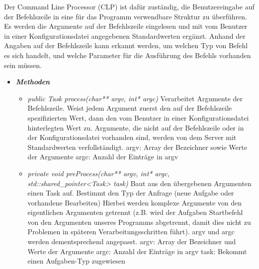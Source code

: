 \documentclass[a4paper,12pt]{article}
\begin{document}
Der Command Line Processor (CLP) ist dafür zuständig, die Benutzereingabe auf der Befehlszeile in eine für das Programm verwendbare Struktur zu überführen. Es werden die Argumente auf der Befehlszeile eingelesen und mit vom Benutzer in einer Konfigurationsdatei angegebenen Standardwerten ergänzt. Anhand der Angaben auf der Befehlszeile kann erkannt werden, um welchen Typ von Befehl es sich handelt, und welche Parameter für die Ausführung des Befehls vorhanden sein müssen.

\begin{itemize}[label={}]

	\item \textit{\textbf{Methoden}}
		\begin{itemize}[label={\textbullet}]
			\item \textit{public Task process(char** argv, int* argc)} Verarbeitet Argumente der Befehlszeile. Weist jedem Argument zuerst den auf der Befehlszeile spezifizierten Wert, dann den vom Benutzer in einer Konfigurationsdatei hinterlegten Wert zu. Argumente, die nicht auf der Befehlszeile oder in der Konfigurationsdatei vorhanden sind, werden von dem Server mit Standardwerten verfollständigt.\newline
			\newline
			argv: Array der Bezeichner sowie Werte der Argumente\newline
			argc: Anzahl der Einträge in argv


			\item \textit{private void preProcess(char** argv, int* argc, std::shared\_pointer<Task> task)}
			Baut aus den übergebenen Argumenten einen Task auf.\newline
			Bestimmt den Typ der Anfrage (neue Aufgabe oder vorhandene Bearbeiten)\newline
			Hierbei werden komplexe Argumente von den eigentlichen Argumenten getrennt (z.B. wird der Aufgaben 	Startbefehl von den Argumenten unseres Programms abgetrennt, damit dies nicht zu Problemen in späteren
			Verarbeitungsschritten führt).\newline
			argv und argc werden dementsprechend angepasst.\newline
			\newline
			argv: Array der Bezeichner und Werte der Argumente\newline
			argc: Anzahl der Einträge in argv\newline
			task: Bekommt einen Aufgaben-Typ zugewiesen



\end{itemize}
\end{itemize}
\end{document}
